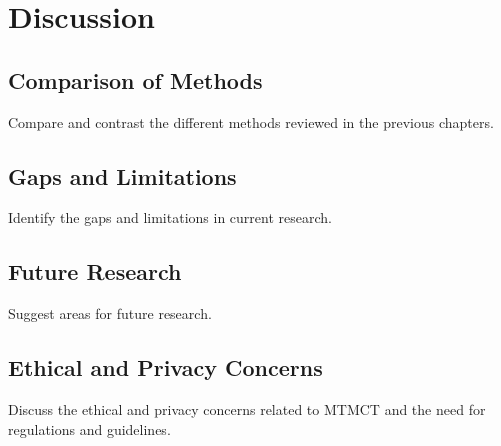 \chapter{Discussion}\label{chap:discussion}

\section{Comparison of Methods}\label{sec:comparison_of_methods}
Compare and contrast the different methods reviewed in the previous chapters.

\section{Gaps and Limitations}\label{sec:gaps_and_limitations}
Identify the gaps and limitations in current research.

\section{Future Research}\label{sec:future_research}
Suggest areas for future research.

\section{Ethical and Privacy Concerns}\label{sec:ethical_and_privacy_concerns}
Discuss the ethical and privacy concerns related to MTMCT and the need for regulations and guidelines.